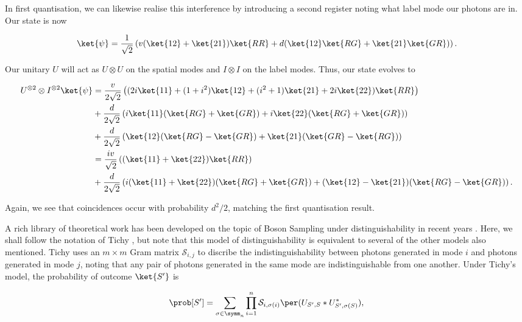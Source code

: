 In first quantisation, we can likewise realise this interference by introducing a second register noting what label mode our photons are in. Our state is now

\begin{equation}
\ket{\psi} = \frac{1}{\sqrt{2}}\left(v(\ket{12}+\ket{21})\ket{RR}+d(\ket{12}\ket{RG} + \ket{21}\ket{GR})\right).
\end{equation}

Our unitary $U$ will act as $U\otimes U$ on the spatial modes and $I\otimes I$ on the label modes. Thus, our state evolves to

\begin{align}
U^{\otimes 2}\otimes I^{\otimes 2}\ket{\psi} &= \frac{v}{2\sqrt{2}}\left((2i\ket{11}+(1+i^2)\ket{12}+(i^2+1)\ket{21}+2i\ket{22})\ket{RR}\right)\nonumber\\
&+\frac{d}{2\sqrt{2}}\left(i\ket{11}(\ket{RG}+\ket{GR})+i\ket{22}(\ket{RG}+\ket{GR})\right)\nonumber\\
&+\frac{d}{2\sqrt{2}}\left(\ket{12}(\ket{RG}-\ket{GR})+\ket{21}(\ket{GR}-\ket{RG})\right)\\
&= \frac{iv}{\sqrt{2}}\left((\ket{11}+\ket{22})\ket{RR}\right)\nonumber\\
&+\frac{d}{2\sqrt{2}}\left(i(\ket{11}+\ket{22})(\ket{RG}+\ket{GR})+(\ket{12}-\ket{21})(\ket{RG}-\ket{GR})\right).
\end{align}

Again, we see that coincidences occur with probability $d^2/2$, matching the first quantisation result.

A rich library of theoretical work has been developed on the topic of Boson Sampling under distinguishability in recent years \cite{rohde2015, shchesnovich2015, tichy2015, tamma2016nonidentical, menssen2017}. Here, we shall follow the notation of Tichy \cite{tichy2015}, but note that this model of distinguishability is equivalent to several of the other models also mentioned. Tichy uses an $m\times m$ Gram matrix $\mathcal{S}_{i,j}$ to discribe the indistinguishability between photons generated in mode $i$ and photons generated in mode $j$, noting that any pair of photons generated in the same mode are indistinguishable from one another. Under Tichy's model, the probability of outcome $\ket{S'}$ is

\begin{equation}
\prob[S'] = \sum_{\sigma\in\symm_n}\prod_{i=1}^n\mathcal{S}_{i,\sigma(i)}\per(U_{S',S}*U_{S',\sigma(S)}^*),
\label{eqn:tichy-perm}
\end{equation}

